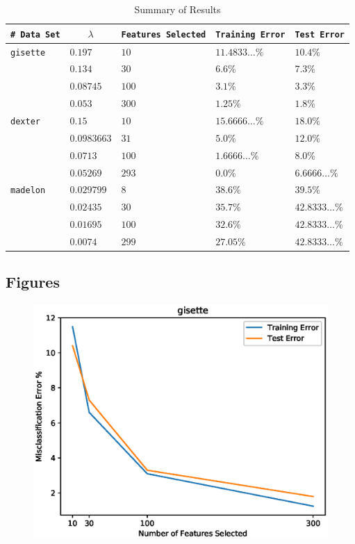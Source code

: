 \documentclass[UTF8]{article}
\begin{document}
\begin{table}[H]
\centering
    \caption{Summary of Results}
    \begin{tabular}{|l|l|l|l|l|}
        \hline
        \texttt{\# Data Set}&\multicolumn{1}{|c|}{$\lambda$}&\texttt{Features Selected}&\texttt{Training Error}&\texttt{Test Error}\\\hline
        \texttt{gisette} & $0.197$ & $10$ & $11.4833\dots\%$ & $10.4\%$\\\cline{2-5}
         & $0.134$ & $30$ & $6.6\%$ & $7.3\%$\\\cline{2-5}
         & $0.08745$ & $100$ & $3.1\%$ & $3.3\%$\\\cline{2-5}
         & $0.053$ & $300$ & $1.25\%$ & $1.8\%$\\\hline\cline{1-5}

        \texttt{dexter} & $0.15$ & $10$ & $15.6666\dots\%$ & $18.0\%$\\\cline{2-5}
         & $0.0983663$ & $31$ & $5.0\%$ & $12.0\%$\\\cline{2-5}
         & $0.0713$ & $100$ & $1.6666\dots\%$ & $8.0\%$\\\cline{2-5}
         & $0.05269$ & $293$ & $0.0\%$ & $6.6666\dots\%$\\\hline\cline{1-5}

        \texttt{madelon} & $0.029799$ & $8$ & $38.6\%$ & $39.5\%$\\\cline{2-5}
         & $0.02435$ & $30$ & $35.7\%$ & $42.8333\dots\%$\\\cline{2-5}
         & $0.01695$ & $100$ & $32.6\%$ & $42.8333\dots\%$\\\cline{2-5}
         & $0.0074$ & $299$ & $27.05\%$ & $42.8333\dots\%$\\\hline
    \end{tabular}
\end{table}

\subsection{Figures}
\begin{figure}[H]
    \centering
    \includegraphics[scale=0.95]{./figures/gisette.eps}
\end{figure}
\end{document}
